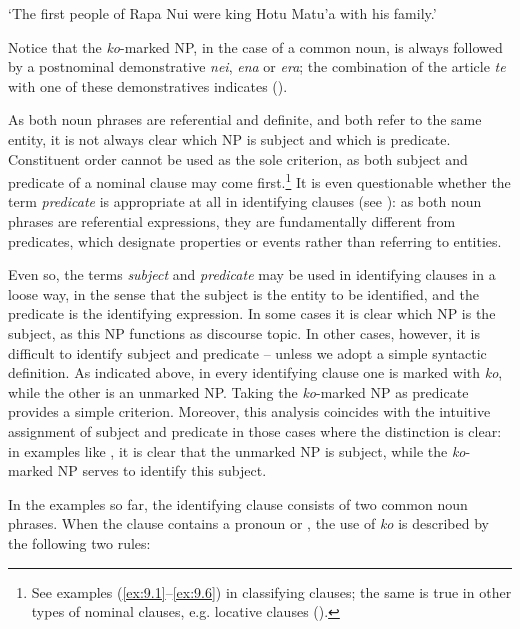 \glt
‘The first people of Rapa Nui were king Hotu Matu’a with his family.’ \textstyleExampleref{[R350.015]} 
\z

Notice that the \textit{ko}{}-marked NP, in the case of a common noun, is always followed by a postnominal demonstrative \textit{nei}, \textit{ena} or \textit{era}; the combination of the article \textit{te} with one of these demonstratives indicates  ().

As both noun phrases are referential and definite, and both refer to the same entity, it is not always clear which NP is subject and which is predicate. Constituent order cannot be used as the sole criterion, as both subject and predicate of a nominal clause may come first.\footnote{\label{fn:461}See examples (\ref{ex:9.1}–\ref{ex:9.6}) in classifying clauses; the same is true in other types of nominal clauses, e.g. locative clauses ().} It is even questionable whether the term \textit{predicate} is appropriate at all in identifying clauses (see \citealt[440]{Anderson2004}): as both noun phrases are referential expressions, they are fundamentally different from predicates, which designate properties or events rather than referring to entities. 

Even so, the terms \textit{subject} and \textit{predicate} may be used in identifying clauses in a loose way, in the sense that the subject is the entity to be identified, and the predicate is the identifying expression. In some cases it is clear which NP is the subject, as this NP functions as discourse topic. In other cases, however, it is difficult to identify subject and predicate – unless we adopt a simple syntactic definition. As indicated above, in every identifying clause one  is marked with \textit{ko}, while the other is an unmarked NP. Taking the \textit{ko}{}-marked NP as predicate provides a simple criterion. Moreover, this analysis coincides with the intuitive assignment of subject and predicate in those cases where the distinction is clear: in examples like , it is clear that the unmarked NP is subject, while the \textit{ko}-marked NP serves to identify this subject.

In the examples so far, the identifying clause consists of two common noun phrases. When the clause contains a pronoun or , the use of \textit{ko} is described by the following two rules:

